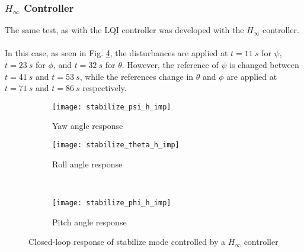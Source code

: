 \subsubsection{$H_\infty$ Controller}
The same test, as with the LQI controller was developed with the $H_\infty$ controller.
\\\\
In this case, as seen in Fig. \ref{fig:stabilize_h_imp}, the disturbances are applied at $t = 11\ s$ for $\psi$, $t = 23\ s$ for $\phi$, and $t = 32\ s$ for $\theta$. However, the reference of $\psi$ is changed between $t = 41\ s$ and $t = 53\ s$, while the references change in $\theta$ and $\phi$ are applied at $t = 71\ s$ and $t = 86\ s$ respectively.
\begin{figure}[H]
\begin{subfigure}{.5\linewidth}
\centering
\texttt{[image: stabilize\_psi\_h\_imp]}
\caption{Yaw angle response}
\label{fig:stabilize_psi_h_imp}
\end{subfigure}%
\begin{subfigure}{.5\linewidth}
\centering
\texttt{[image: stabilize\_theta\_h\_imp]}
\caption{Roll angle response}
\label{fig:stabilize_theta_h_imp}
\end{subfigure}\\[1ex]
\begin{subfigure}{\linewidth}
\centering
\texttt{[image: stabilize\_phi\_h\_imp]}
\caption{Pitch angle response}
\label{fig:stabilize_psi_h_imp}
\end{subfigure}
\caption{Closed-loop response of stabilize mode controlled by a $H_\infty$ controller}
\label{fig:stabilize_h_imp}
\end{figure}
